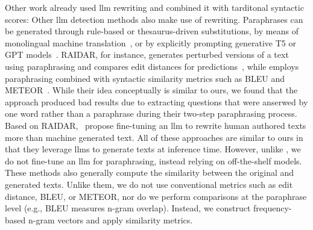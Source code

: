 Other work already used \ac{llm} rewriting and combined it with tarditonal syntactic scores:
Other \ac{llm} detection methods also make use of rewriting. 
Paraphrases can be generated through rule-based or thesaurus-driven substitutions, by means of monolingual machine translation~\citep{zhou_paraphrase_2021}, or by explicitly prompting generative T5 or GPT models~\citep{kurt_pehlivanoglu_comparative_2024}.
RAIDAR, for instance, generates perturbed versions of a text using paraphrasing and compares edit distances for predictions~\citep{mao_raidar_2024}, while \mirrorMinds{} employs paraphrasing combined with syntactic similarity metrics such as BLEU and METEOR~\citep{baradia_mirror_2025}. 
While their idea conceptually is similar to ours, we found that the \mirrorMinds{} approach produced bad results due to extracting questions that were anserwed by one word rather than a paraphrase during their two-step paraphrasing process.
Based on RAIDAR, \citet{li_learning_2025}\ propose fine-tuning an \ac{llm} to rewrite human authored texts more than machine generated text.
All of these approaches are similar to ours in that they leverage \acp{llm} to generate texts at inference time. 
However, unlike \citet{li_learning_2025}, we do not fine-tune an \ac{llm} for paraphrasing, instead relying on off-the-shelf models.
These methods also generally compute the similarity between the original and generated texts. 
Unlike them, we do not use conventional metrics such as edit distance, BLEU, or METEOR, nor do we perform comparisons at the paraphrase level (e.g., BLEU measures n-gram overlap). 
Instead, we construct frequency-based n-gram vectors and apply similarity metrics.

